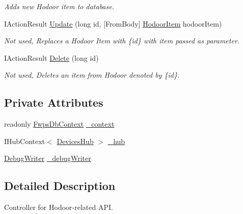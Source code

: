 \begin{DoxyCompactItemize}
\begin{DoxyCompactList}\small\item\em Adds new Hodoor item to database. \end{DoxyCompactList}\item 
I\+Action\+Result \mbox{\hyperlink{class_f_w_p_s_1_1_controllers_1_1_hodoor_controller_a024011e1456e9634e741fdbc30ddd482}{Update}} (long id, \mbox{[}From\+Body\mbox{]} \mbox{\hyperlink{class_f_w_p_s_1_1_models_1_1_hodoor_item}{Hodoor\+Item}} hodoor\+Item)
\begin{DoxyCompactList}\small\item\em Not used, Replaces a Hodoor Item with \{id\} with item passed as parameter. \end{DoxyCompactList}\item 
I\+Action\+Result \mbox{\hyperlink{class_f_w_p_s_1_1_controllers_1_1_hodoor_controller_aa0b89f247140f77be91067dd79d68345}{Delete}} (long id)
\begin{DoxyCompactList}\small\item\em Not used, Deletes an item from Hodoor denoted by \{id\}. \end{DoxyCompactList}\end{DoxyCompactItemize}
\subsection*{Private Attributes}
\begin{DoxyCompactItemize}
\item 
readonly \mbox{\hyperlink{class_f_w_p_s_1_1_data_1_1_fwps_db_context}{Fwps\+Db\+Context}} \mbox{\hyperlink{class_f_w_p_s_1_1_controllers_1_1_hodoor_controller_af225a1072fecdf625330a84e5b7846a8}{\+\_\+context}}
\item 
I\+Hub\+Context$<$ \mbox{\hyperlink{class_f_w_p_s_1_1_devices_hub}{Devices\+Hub}} $>$ \mbox{\hyperlink{class_f_w_p_s_1_1_controllers_1_1_hodoor_controller_a30e9f233a802a0fa45a43ecec1979db9}{\+\_\+hub}}
\item 
\mbox{\hyperlink{class_f_w_p_s_1_1_debug_writer}{Debug\+Writer}} \mbox{\hyperlink{class_f_w_p_s_1_1_controllers_1_1_hodoor_controller_a192eed3a6a2a5aeaf53c37ca5cfb94c4}{\+\_\+debug\+Writer}}
\end{DoxyCompactItemize}


\subsection{Detailed Description}
Controller for Hodoor-\/related A\+PI. 

